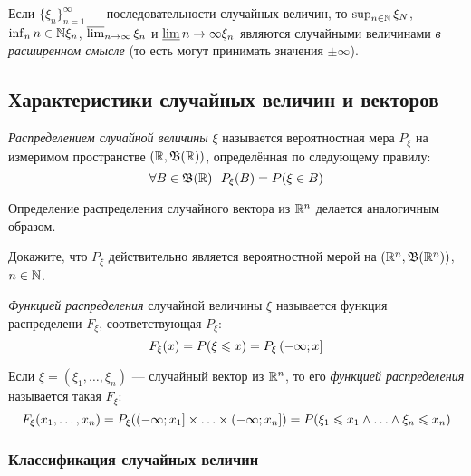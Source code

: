 \begin{proposition}
	Если $\{\xi_n\}_{n = 1}^\infty$ --- последовательности случайных величин, то $\sup_{n \in \mathbb{N}} \xi_N$, $\inf_n{n \in \mathbb{N}} \xi_n$, $\varlimsup_{n \to \infty} \xi_n$ и $\varliminf{n \to \infty} \xi_n$ являются случайными величинами \textit{в расширенном смысле} (то есть могут принимать значения $\pm\infty$).
\end{proposition}

\subsection{Характеристики случайных величин и векторов}

\begin{definition}
	\textit{Распределением случайной величины} $\xi$ называется вероятностная мера $P_\xi$ на измеримом пространстве $(\mathbb{R}, \mathfrak{B}(\mathbb{R}))$, определённая по следующему правилу:
	\[
		\forall B \in \mathfrak{B}(\mathbb{R})\ \  P_\xi(B) = P(\xi \in B)
	\]
\end{definition}

\begin{note}
	Определение распределения случайного вектора из $\mathbb{R}^n$ делается аналогичным образом.
\end{note}

\begin{exercise}
	Докажите, что $P_\xi$ действительно является вероятностной мерой на $(\mathbb{R}^n, \mathfrak{B}(\mathbb{R}^n))$, $n \in \mathbb{N}$.
\end{exercise}

\begin{definition}
	\textit{Функцией распределения} случайной величины $\xi$ называется функция распределени $F_\xi$, соответствующая $P_\xi$:
	\[
		F_\xi(x) = P(\xi \leqslant x) = P_\xi\left(-\infty; x\right]
	\]
\end{definition}

\begin{definition}
	Если $\xi = (\xi_1, \ldots, \xi_n)$ --- случайный вектор из $\mathbb{R}^n$, то его \textit{функцией распределения} называется такая $F_\xi$:
	\[
		F_\xi(x_1, \ldots, x_n) = P_\xi(\left(-\infty; x_1\right] \times \ldots \times \left(-\infty; x_n\right]) = P(\xi_1 \leqslant x_1 \wedge \ldots \wedge \xi_n \leqslant x_n)
	\]
\end{definition}

\subsubsection*{Классификация случайных величин}

